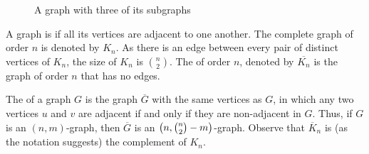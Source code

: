 \begin{Example}
\begin{figure}[!htbp]
\caption{A graph with three of its subgraphs}\label{fig:Subgraphs}
\end{figure}
\end{Example}

A graph is  if all its vertices are adjacent to one another. The complete graph of order $n$ is denoted by $K_n$. As there is an edge between every pair of distinct vertices of $K_n$, the size of $K_n$ is $\binom n 2$. The  of order $n$, denoted by $\overline{K_n}$ is the graph of order $n$ that has no edges.

The  of a graph $G$ is the graph $\overline G$ with the same vertices as $G$, in which any two vertices $u$ and $v$ are adjacent if and only if they are non-adjacent in $G$. Thus, if $G$ is an $(n, m)$-graph, then $\overline G$ is an $\pqty{n, \binom n 2 - m}$-graph. Observe that $\overline K_n$ is (as the notation suggests) the complement of $K_n$.

